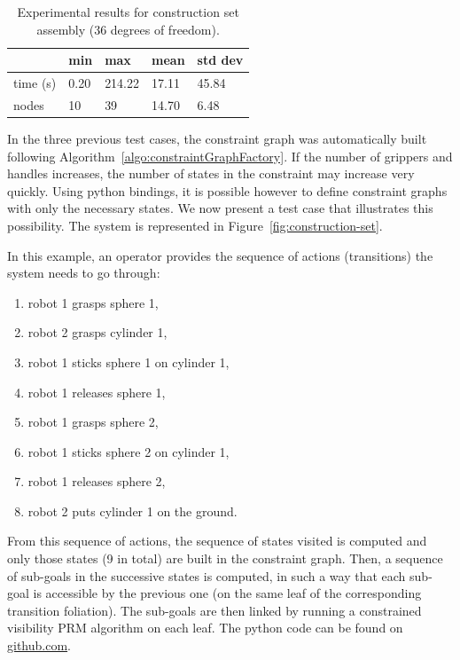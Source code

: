 \begin{table}
  \begin{center}
  \begin{tabular}{|l|l|l|l|l|}
    \hline
    & min & max & mean & std dev \\
    \hline
    time (s) & 0.20 & 214.22 & 17.11 & 45.84 \\
    nodes & 10 &  39 & 14.70 & 6.48 \\
    \hline
  \end{tabular}
  \end{center}
  \caption{Experimental results for construction set assembly
    {\color{blue}(36 degrees of freedom)}.}
  \label{tab:construction-set}
\end{table}

In the three previous test cases, the constraint graph was automatically built
following Algorithm~\ref{algo:constraintGraphFactory}. If the number of grippers
and handles increases, the number of states in the constraint may increase very
quickly. Using python bindings, it is possible however to define constraint
graphs with only the necessary states. We now present a test case that
illustrates this possibility. The system is represented in Figure~\ref{fig:construction-set}.

In this example, an operator provides the sequence of actions (transitions)
the system needs to go through:
\begin{enumerate}
\item robot 1 grasps sphere 1,
\item robot 2 grasps cylinder 1,
\item robot 1 sticks sphere 1 on cylinder 1,
\item robot 1 releases sphere 1,
\item robot 1 grasps sphere 2,
\item robot 1 sticks sphere 2 on cylinder 1,
\item robot 1 releases sphere 2,
\item robot 2 puts cylinder 1 on the ground.
\end{enumerate}
From this sequence of actions, the sequence of states visited is
computed and only those states (9 in total) are built in the
constraint graph. Then, a sequence of sub-goals in the successive
states is computed, in such a way that each sub-goal is accessible by
the previous one (on the same leaf of the corresponding transition
foliation). The sub-goals are then linked by running a constrained visibility
PRM algorithm \cite{SimLauNis00} on each leaf. The python code can be found
on \href{https://github.com/humanoid-path-planner/hpp_benchmark/blob/master/2020-07-23/construction-set/script.py}{github.com}.

